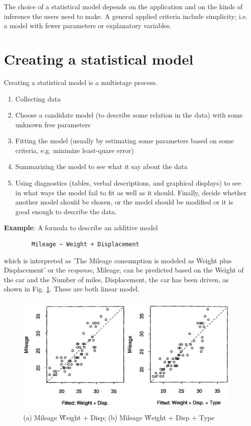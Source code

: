 The choice of a statistical model depends on the application and on
the kinds of inference the users need to make. A general applied
criteria include simplicity; i.e. a model with fewer parameters or
explanatory variables.


\section{Creating a statistical model}
\label{sec:creat-stat-model}

Creating a statistical model is a multistage process.
\begin{enumerate}
\item Collecting data

\item Choose a candidate model (to describe some relation in the
  data) with some unknown free parameters

\item Fitting the model (usually by estimating some parameters based
  on some criteria, e.g. minimize least-quare error)

\item Summarizing the model to see what it say about the data

\item Using diagnostics (tables, verbal descriptions, and graphical
  displays) to see in what ways the model fail to fit as well as it
  should. Finally, decide whether another model should be chosen, or
  the model should be modified or it is good enough to describe the
  data.
\end{enumerate}

{\bf Example}: A formula to describe an additive model

\begin{verbatim}
        Mileage ~ Weight + Displacement
\end{verbatim}
which is interpreted as 'The Mileage consumption is modeled as Weight
plus Displacement' or the {\it response}, Mileage, can be predicted based
on the Weight of the car and the Number of miles, Displacement, the
car has been driven, as shown in Fig. \ref{fig:car_model}. These are
both linear model.

\begin{figure}[htb]
  \centerline{\includegraphics[height=6cm]{./images/sample_car_model.eps}}
  \caption{(a) Mileage \~ Weight + Disp; (b) Mileage \~ Weight +
    Disp + Type}\label{fig:car_model}
\end{figure}

